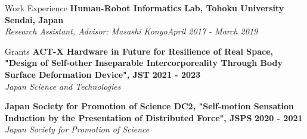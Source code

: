 \documentclass{resume} %
\begin{document}
\begin{rSection}{Work Experience}
{\bf Human-Robot Informatics Lab, Tohoku University } \hfill {\bf Sendai, Japan} 
\\{\em  Research Assistant, Advisor: Masashi Konyo}\hfill {\em April 2017 - March 2019} 
\end{rSection}

\begin{rSection}{Grants}
{\bf ACT-X Hardware in Future for Resilience of Real Space, "Design of Self-other Inseparable Intercorporeality Through Body Surface Deformation Device", JST} \hfill {\bf 2021 - 2023}
\\{\em Japan Science and Technologies} \\
\vspace{-3mm}

{\bf Japan Society for Promotion of Science DC2, "Self-motion Sensation Induction by the Presentation of Distributed Force", JSPS} \hfill {\bf 2020 - 2021}
\\{\em Japan Society for Promotion of Science} \\
\vspace{-3mm}
\end{rSection}
\end{document}

